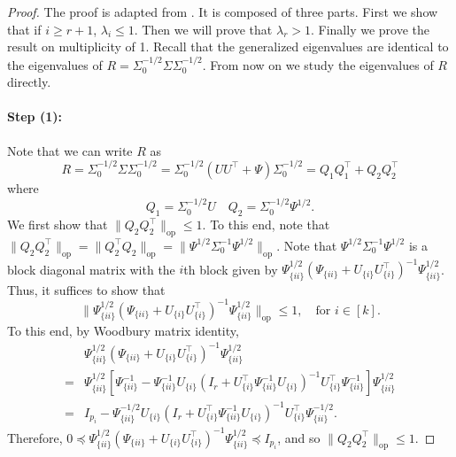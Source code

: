 \documentclass[11pt]{article}
\newcommand{\dc}[1]{\{#1\}} %
\newcommand{\0}{{\mathbf{0}}}
\newcommand{\op}{{\mathrm{op}}}
\begin{document}
\begin{proof}
The proof is adapted from \cite{fan2019estimating}. 
It is composed of three parts.
First we show that if $i\geq r+1$, $\lambda_i\leq 1$. 
Then we will prove that $\lambda_r>1$.
Finally we prove the result on multiplicity of 1. 
Recall that the generalized eigenvalues are identical to the eigenvalues of $R=\Sigma_0^{-1/2}\Sigma\Sigma_0^{-1/2}$. 
From now on we study the eigenvalues of $R$ directly. 

\paragraph{Step (1):} 
Note that we can write $R$ as 
\begin{equation*}
R=\Sigma_0^{-1/2}\Sigma\Sigma_0^{-1/2}=\Sigma_0^{-1/2}(UU^\top +\Psi)\Sigma_0^{-1/2}=Q_1Q_1^\top +Q_2Q_2^\top 
\end{equation*} 
where 
\begin{equation*}
Q_1=\Sigma_0^{-1/2}U\quad Q_2=\Sigma_0^{-1/2}\Psi^{1/2}.
\end{equation*}
We first show that $\|Q_2 Q_2^\top\|_{\op} \leq 1$.
To this end, note that 
$\|Q_2 Q_2^\top\|_{\op} = \|Q_2^\top Q_2\|_{\op} = \|\Psi^{1/2}\Sigma_0^{-1}\Psi^{1/2}\|_{\op}$.
Note that $\Psi^{1/2}\Sigma_0^{-1}\Psi^{1/2}$ is a block diagonal matrix with the $i$th block given by $\Psi^{1/2}_{\dc{ii}}(\Psi_{\dc{ii}} + U_{\dc{i}} U^\top_{\dc{i}})^{-1} \Psi^{1/2}_{\dc{ii}}$.
Thus, it suffices to show that 
\begin{equation*}
\|\Psi^{1/2}_{\dc{ii}}(\Psi_{\dc{ii}} + U_{\dc{i}} U^\top_{\dc{i}})^{-1} \Psi^{1/2}_{\dc{ii}}\|_{\op} \leq 1, \quad
\mbox{for $i\in [k]$}.
\end{equation*}
To this end, by Woodbury matrix identity,
\begin{align*}
&\Psi^{1/2}_{\dc{ii}}(\Psi_{\dc{ii}} + U_{\dc{i}} U^\top_{\dc{i}})^{-1} \Psi^{1/2}_{\dc{ii}}\\
=&    
\Psi^{1/2}_{\dc{ii}}[ \Psi^{-1}_{\dc{ii}} - \Psi^{-1}_{\dc{ii}}U_{\dc{i}} (I_r + U^\top_{\dc{i}}\Psi^{-1}_{\dc{ii}}U_{\dc{i}})^{-1} U^\top_{\dc{i}} \Psi^{-1}_{\dc{ii}} ]\Psi^{1/2}_{\dc{ii}} \\
=& 
I_{p_i} - \Psi^{-1/2}_{\dc{ii}}U_{\dc{i}} (I_r + U^\top_{\dc{i}}\Psi^{-1}_{\dc{ii}}U_{\dc{i}})^{-1} U^\top_{\dc{i}} \Psi^{-1/2}_{\dc{ii}}.
\end{align*}
Therefore, $0 \preceq \Psi^{1/2}_{\dc{ii}}(\Psi_{\dc{ii}} + U_{\dc{i}} U^\top_{\dc{i}})^{-1} \Psi^{1/2}_{\dc{ii}}  \preceq I_{p_i}$, and so $\|Q_2 Q_2^\top\|_{\op} \leq 1$.


\end{proof}
\end{document}
